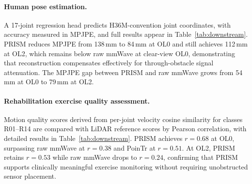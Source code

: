 \documentclass{article}
\begin{document}
\paragraph{Human pose estimation.}
A 17-joint regression head predicts H36M-convention joint coordinates, with
accuracy measured in MPJPE, and full results appear in Table~\ref{tab:downstream}.
PRISM reduces MPJPE from 138\,mm to 84\,mm at OL0 and still achieves 112\,mm
at OL2, which remains below raw mmWave at clear-view OL0, demonstrating that
reconstruction compensates effectively for through-obstacle signal attenuation.
The MPJPE gap between PRISM and raw mmWave grows from 54\,mm at OL0 to 79\,mm
at OL2.

\paragraph{Rehabilitation exercise quality assessment.}
Motion quality scores derived from per-joint velocity cosine similarity for classes
R01--R14 are compared with LiDAR reference scores by Pearson correlation,
with detailed results in Table~\ref{tab:downstream}.
PRISM achieves $r\!=\!0.68$ at OL0, surpassing raw mmWave at $r\!=\!0.38$ and
PoinTr at $r\!=\!0.51$.
At OL2, PRISM retains $r\!=\!0.53$ while raw mmWave drops to $r\!=\!0.24$,
confirming that PRISM supports clinically meaningful exercise monitoring without
requiring unobstructed sensor placement.

\begin{table}[t]
  \centering
  \caption{Downstream task performance on MIST (test subjects P07--P08).}
  \label{tab:downstream}
  \tiny
  \setlength{\tabcolsep}{4pt}
\end{table}
\end{document}
